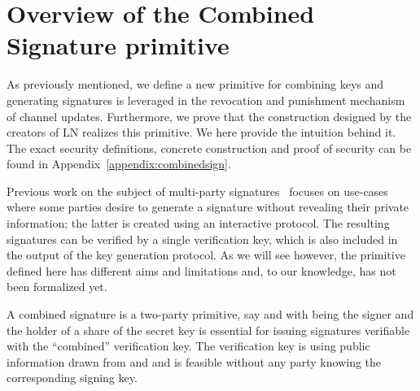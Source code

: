 \section{Overview of the Combined Signature primitive}
\label{sec:ov-combined-ds}
  As previously mentioned, we define a new primitive for combining keys and
  generating signatures is leveraged in the revocation and
  punishment mechanism of channel updates. Furthermore, we prove that the
  construction designed by the creators of LN realizes this primitive. We here
  provide 
  the intuition behind it. The exact security definitions, concrete construction
  and proof of security can be found in Appendix~\ref{appendix:combinedsign}.

  Previous work on the subject of multi-party
  signatures~\cite{DBLP:conf/ndss/NicolosiKDM03,DBLP:journals/iacr/BellareS01,boyd1986digital,DBLP:conf/ndss/Ganesan95a,DBLP:conf/crypto/MacKenzieR01,ganesan1994secure}
  focuses on use-cases where some parties desire to generate a signature without
  revealing their private information; the latter is created using an
  interactive protocol. The resulting signatures can be verified by a single
  verification key, which is also included in the output of the key generation
  protocol. As we will see however, the primitive defined here has different
  aims and limitations and, to our knowledge, has not been formalized yet.

  A combined signature is a two-party primitive, say  \alice{}
  and \bob\redden{,} with \bob{} being the signer and \alice{} the holder of a
  share of the secret key is essential for issuing
  signatures verifiable with the ``combined''
  verification key. The verification key is  using public
  information drawn from \alice{} and \bob{} and is feasible without any party
  knowing the corresponding signing key. 

